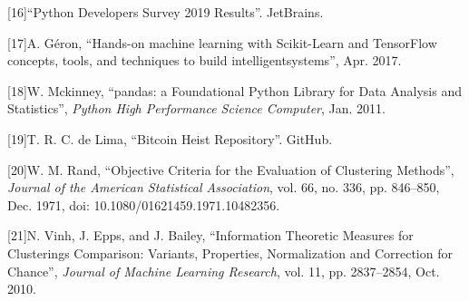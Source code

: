 \documentclass[10pt]{article}
\begin{document}
\label{csl:16}[16]``{Python Developers Survey 2019 Results}''. JetBrains.

\label{csl:17}[17]A. G\'{e}ron, ``{Hands-on machine learning with {Scikit-Learn} and {TensorFlow} concepts, tools, and techniques to build intelligentsystems}'', Apr. 2017.

\label{csl:18}[18]W. Mckinney, ``{pandas: a Foundational Python Library for Data Analysis and Statistics}'', \textit{Python High Performance Science Computer}, Jan. 2011.

\label{csl:19}[19]T. R. C. de Lima, ``{Bitcoin Heist Repository}''. GitHub.

\label{csl:20}[20]W. M. Rand, ``{Objective Criteria for the Evaluation of Clustering Methods}'', \textit{Journal of the American Statistical Association}, vol. 66, no. 336, pp. 846–850, Dec. 1971, doi: 10.1080/01621459.1971.10482356.

\label{csl:21}[21]N. Vinh, J. Epps, and J. Bailey, ``{Information Theoretic Measures for Clusterings Comparison: Variants, Properties, Normalization and Correction for Chance}'', \textit{Journal of Machine Learning Research}, vol. 11, pp. 2837–2854, Oct. 2010.
\end{document}
